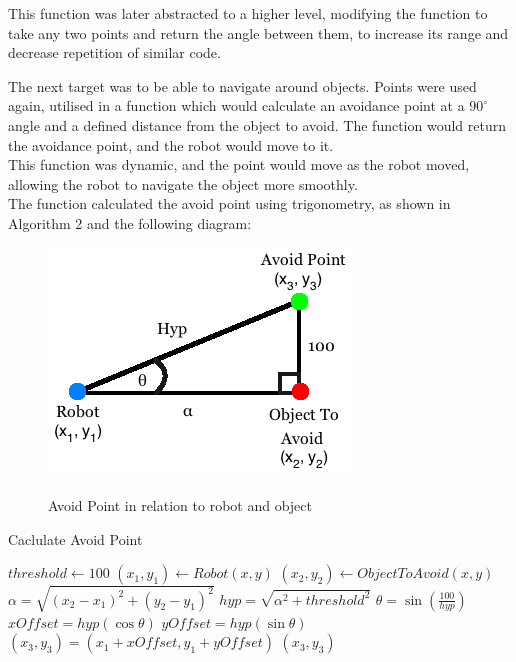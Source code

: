 This function was later abstracted to a higher level, modifying the function to take any two points and return the angle between them, to increase its range and decrease repetition of similar code. \linebreak

The next target was to be able to navigate around objects. Points were used again, utilised in a function which would calculate an avoidance point at a $90^{\circ}$ angle and a defined distance from the object to avoid. The function would return the avoidance point, and the robot would move to it. \\
This function was dynamic, and the point would move as the robot moved, allowing the robot to navigate the object more smoothly.\\
The function calculated the avoid point using trigonometry, as shown in Algorithm 2 and the following diagram:
\begin{center}
\begin{figure}[htp]
\leavevmode
\includegraphics[scale=0.6]{images/AvoidPoints.png}
\label{fig:AvoidPointDiagram}
\caption{Avoid Point in relation to robot and object}
\end{figure}
\end{center}

\begin{algorithm}
\caption{Caclulate Avoid Point}
\label{avoidPoint}
\begin{algorithmic}[1]
\STATE $threshold \gets 100$
\STATE $(x_{1}, y_{1}) \gets Robot (x, y)$
\STATE $(x_{2}, y_{2}) \gets Object To Avoid (x, y)$
\STATE $\alpha = \sqrt{(x_{2} - x_{1})^{2} + (y_{2} - y_{1})^{2}}$
\STATE $hyp = \sqrt{\alpha^{2} + threshold^{2}}$
\STATE $\theta = \sin(\frac{100}{hyp})$
\STATE $xOffset = hyp(\cos\theta)$
\STATE $yOffset = hyp(\sin\theta)$
\STATE $(x_{3}, y_{3}) = (x_{1} + xOffset, y_{1} + yOffset)$
\RETURN $(x_{3}, y_{3})$
\end{algorithmic}
\end{algorithm}

